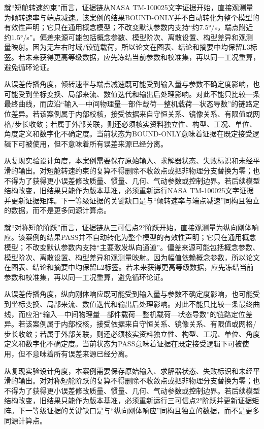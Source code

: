 \documentclass[UTF8,12pt,openany]{ctexbook}
\begin{document}
就“短舱转速约束”而言，证据链从NASA TM-100025文字证据开始，直接观测量为倾转速率与端点减速。该案例的结果BOUND-ONLY并不自动转化为整个模型的有效性声明；它只在通用概念模型；不改变默认参数内支持“约7.5°/s，端点附近约1.5°/s”。偏差来源可能包括概念参数、模型阶次、离散设置、构型差异和观测量映射。因为无左右时域/铰链载荷，所以论文在图表、结论和摘要中均保留L3标签。若未来获得更高等级数据，应先冻结当前参数和校准集，再以同一工况重算，避免循环论证。

从误差传播角度，倾转速率与端点减速既可能受到输入量与参数不确定度影响，也可能受到坐标变换、局部来流、数值迭代和输出后处理影响。对此不能只比较一条最终曲线，而应沿“输入—中间物理量—部件载荷—整机载荷—状态导数”的链路定位差异。若该案例属于内部校核，接受依据来自守恒关系、镜像关系、有限值或网格/步长收敛；若属于外部关联，则还必须核实资料独立性、构型、工况、单位、角度定义和数字化不确定度。当前状态为BOUND-ONLY意味着证据在既定接受逻辑下可被使用，但不意味着所有误差来源已经分离。

从复现实验设计角度，本案例需要保存原始输入、求解器状态、失败标识和未经平滑的输出。对短舱转速约束的复算不得删除不收敛点或把非物理分支替换为零；也不得为了获得更小误差修改质量、惯量、几何、气动参数或控制边界。若后续模型结构改变，旧结果只能作为版本基准，必须重新运行NASA TM-100025文字证据并更新证据矩阵。下一等级证据的关键缺口是与“倾转速率与端点减速”同构且独立的数据，而不是更多同源计算点。

就“对称短舱阶跃”而言，证据链从三可信点2°阶跃开始，直接观测量为纵向刚体响应。该案例的结果PASS并不自动转化为整个模型的有效性声明；它只在通用概念模型；不改变默认参数内支持“主要激发纵向通道”。偏差来源可能包括概念参数、模型阶次、离散设置、构型差异和观测量映射。因为幅值依赖概念参数，所以论文在图表、结论和摘要中均保留L2标签。若未来获得更高等级数据，应先冻结当前参数和校准集，再以同一工况重算，避免循环论证。

从误差传播角度，纵向刚体响应既可能受到输入量与参数不确定度影响，也可能受到坐标变换、局部来流、数值迭代和输出后处理影响。对此不能只比较一条最终曲线，而应沿“输入—中间物理量—部件载荷—整机载荷—状态导数”的链路定位差异。若该案例属于内部校核，接受依据来自守恒关系、镜像关系、有限值或网格/步长收敛；若属于外部关联，则还必须核实资料独立性、构型、工况、单位、角度定义和数字化不确定度。当前状态为PASS意味着证据在既定接受逻辑下可被使用，但不意味着所有误差来源已经分离。

从复现实验设计角度，本案例需要保存原始输入、求解器状态、失败标识和未经平滑的输出。对对称短舱阶跃的复算不得删除不收敛点或把非物理分支替换为零；也不得为了获得更小误差修改质量、惯量、几何、气动参数或控制边界。若后续模型结构改变，旧结果只能作为版本基准，必须重新运行三可信点2°阶跃并更新证据矩阵。下一等级证据的关键缺口是与“纵向刚体响应”同构且独立的数据，而不是更多同源计算点。
\end{document}
